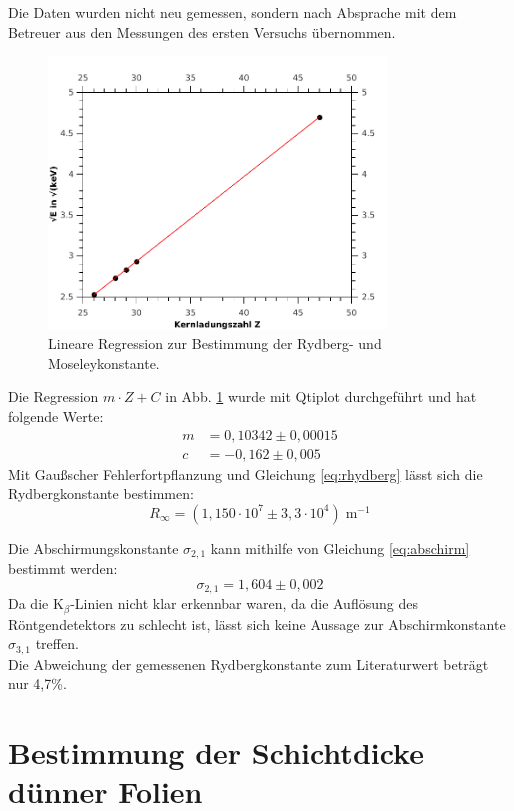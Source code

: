 Die Daten wurden nicht neu gemessen, sondern nach Absprache mit dem Betreuer aus den Messungen des ersten Versuchs übernommen.
\begin{figure}[h]
	\centering\includegraphics[width=0.8\textwidth]{fig/a3_fit}
	\caption{Lineare Regression zur Bestimmung der Rydberg- und Moseleykonstante.}
	\label{fig:a3_fit}
\end{figure}
Die Regression $m\cdot Z + C$ in Abb. \ref{fig:a3_fit} wurde mit Qtiplot durchgeführt und hat folgende Werte:
\begin{align}
	m &= 0,10342\pm 0,00015\\
	c &= -0,162\pm 0,005
\end{align}
Mit Gaußscher Fehlerfortpflanzung und Gleichung \ref{eq:rhydberg} lässt sich die Rydbergkonstante bestimmen:
\begin{equation}
	R_{\infty} = (1,150\cdot 10^{7}\pm 3,3\cdot 10^{4})\;\si{\metre}^{-1}
\end{equation}

Die Abschirmungskonstante $\sigma_{2,1}$ kann mithilfe von Gleichung \ref{eq:abschirm} bestimmt werden:
\begin{equation}
	\sigma_{2,1} = 1,604\pm 0,002
\end{equation}
Da die K$_\beta$-Linien nicht klar erkennbar waren, da die Auflösung des Röntgendetektors zu schlecht ist, lässt sich keine Aussage zur Abschirmkonstante $\sigma_{3,1}$ treffen.\\
Die Abweichung der gemessenen Rydbergkonstante zum Literaturwert beträgt nur 4,7\;\%.

\section{Bestimmung der Schichtdicke dünner Folien}

